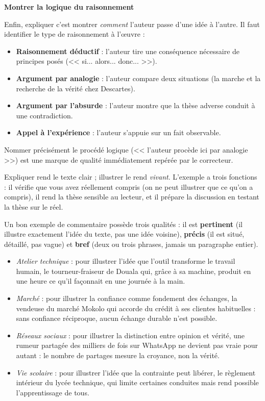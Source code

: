 \documentclass[11pt]{article}
\newcounter{popsec}
\newcounter{popsub}
\newcommand{\courssub}[1]{%
  \stepcounter{popsub}%
  \par\vspace{9pt}\noindent{\popxbold\fontsize{11.5}{13}\selectfont\color{popink}{\color{poporange}\thepopsec.\thepopsub}\hspace{6pt}#1}\par\nopagebreak\vspace{4pt}
}
\begin{document}
\textbf{Montrer la logique du raisonnement}\par

Enfin, expliquer c'est montrer \emph{comment} l'auteur passe d'une idée à l'autre. Il faut identifier le type de raisonnement à l'œuvre :

\begin{itemize}
\item \textbf{Raisonnement déductif} : l'auteur tire une conséquence nécessaire de principes posés (<< si... alors... donc... >>).
\item \textbf{Argument par analogie} : l'auteur compare deux situations (la marche et la recherche de la vérité chez Descartes).
\item \textbf{Argument par l'absurde} : l'auteur montre que la thèse adverse conduit à une contradiction.
\item \textbf{Appel à l'expérience} : l'auteur s'appuie sur un fait observable.
\end{itemize}

Nommer précisément le procédé logique (<< l'auteur procède ici par analogie >>) est une marque de qualité immédiatement repérée par le correcteur.

\courssub{Illustrer : la force de l'exemple concret}

Expliquer rend le texte clair ; illustrer le rend \emph{vivant}. L'exemple a trois fonctions : il vérifie que vous avez réellement compris (on ne peut illustrer que ce qu'on a compris), il rend la thèse sensible au lecteur, et il prépare la discussion en testant la thèse sur le réel.

Un bon exemple de commentaire possède trois qualités : il est \textbf{pertinent} (il illustre exactement l'idée du texte, pas une idée voisine), \textbf{précis} (il est situé, détaillé, pas vague) et \textbf{bref} (deux ou trois phrases, jamais un paragraphe entier).

\begin{exemplebox}
\begin{itemize}
\item \emph{Atelier technique} : pour illustrer l'idée que l'outil transforme le travail humain, le tourneur-fraiseur de Douala qui, grâce à sa machine, produit en une heure ce qu'il façonnait en une journée à la main.
\item \emph{Marché} : pour illustrer la confiance comme fondement des échanges, la vendeuse du marché Mokolo qui accorde du crédit à ses clientes habituelles : sans confiance réciproque, aucun échange durable n'est possible.
\item \emph{Réseaux sociaux} : pour illustrer la distinction entre opinion et vérité, une rumeur partagée des milliers de fois sur WhatsApp ne devient pas vraie pour autant : le nombre de partages mesure la croyance, non la vérité.
\item \emph{Vie scolaire} : pour illustrer l'idée que la contrainte peut libérer, le règlement intérieur du lycée technique, qui limite certaines conduites mais rend possible l'apprentissage de tous.
\end{itemize}
\end{exemplebox}
\end{document}
